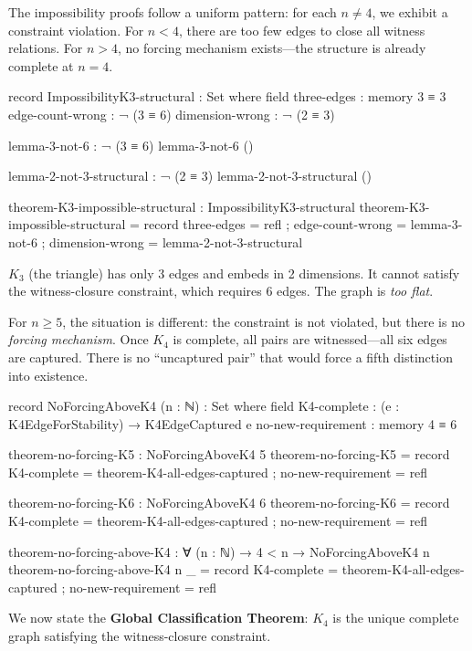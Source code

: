 \documentclass[11pt,a4paper]{book}
\begin{document}
The impossibility proofs follow a uniform pattern: for each $n \neq 4$, we exhibit a constraint violation. 
For $n < 4$, there are too few edges to close all witness relations.
For $n > 4$, no forcing mechanism exists---the structure is already complete at $n = 4$.

\begin{code}
record ImpossibilityK3-structural : Set where
  field
    three-edges     : memory 3 ≡ 3
    edge-count-wrong : ¬ (3 ≡ 6)
    dimension-wrong  : ¬ (2 ≡ 3)

lemma-3-not-6 : ¬ (3 ≡ 6)
lemma-3-not-6 ()

lemma-2-not-3-structural : ¬ (2 ≡ 3)
lemma-2-not-3-structural ()

theorem-K3-impossible-structural : ImpossibilityK3-structural
theorem-K3-impossible-structural = record
  { three-edges      = refl
  ; edge-count-wrong = lemma-3-not-6
  ; dimension-wrong  = lemma-2-not-3-structural
  }
\end{code}

$K_3$ (the triangle) has only 3 edges and embeds in 2 dimensions. It cannot satisfy the witness-closure constraint, which requires 6 edges. The graph is \emph{too flat}.

For $n \geq 5$, the situation is different: the constraint is not violated, but there is no \emph{forcing mechanism}. Once $K_4$ is complete, all pairs are witnessed---all six edges are captured. There is no ``uncaptured pair'' that would force a fifth distinction into existence.

\begin{code}
record NoForcingAboveK4 (n : ℕ) : Set where
  field
    K4-complete        : (e : K4EdgeForStability) → K4EdgeCaptured e
    no-new-requirement : memory 4 ≡ 6

theorem-no-forcing-K5 : NoForcingAboveK4 5
theorem-no-forcing-K5 = record
  { K4-complete        = theorem-K4-all-edges-captured
  ; no-new-requirement = refl
  }

theorem-no-forcing-K6 : NoForcingAboveK4 6
theorem-no-forcing-K6 = record
  { K4-complete        = theorem-K4-all-edges-captured
  ; no-new-requirement = refl
  }

theorem-no-forcing-above-K4 : ∀ (n : ℕ) → 4 < n → NoForcingAboveK4 n
theorem-no-forcing-above-K4 n _ = record
  { K4-complete = theorem-K4-all-edges-captured
  ; no-new-requirement = refl
  }
\end{code}

We now state the \textbf{Global Classification Theorem}: $K_4$ is the unique complete graph satisfying the witness-closure constraint.
\end{document}
